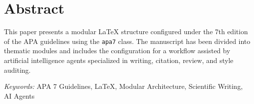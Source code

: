 
\section*{Abstract}

This paper presents a modular \LaTeX{} structure configured under the 7th edition of the APA guidelines using the \texttt{apa7} class. The manuscript has been divided into thematic modules and includes the configuration for a workflow assisted by artificial intelligence agents specialized in writing, citation, review, and style auditing.

\indent\textit{Keywords:} APA 7 Guidelines, LaTeX, Modular Architecture, Scientific Writing, AI Agents